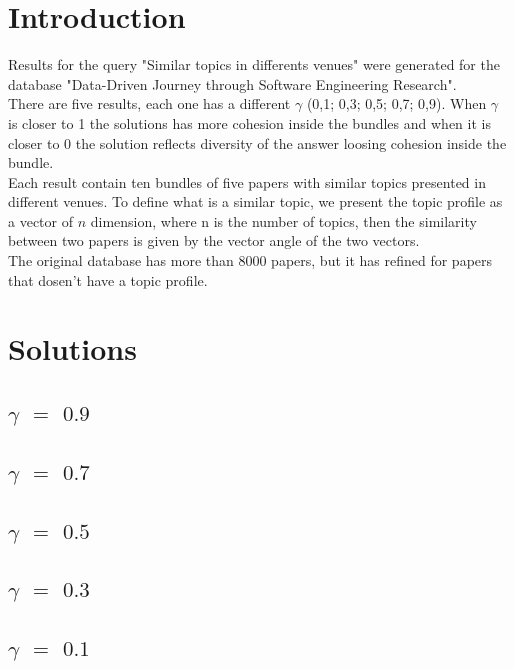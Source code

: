 \section{Introduction}
Results for the query "Similar topics in differents venues" were generated for the database 
"Data-Driven Journey through Software Engineering Research".\\
There are five results, each one has a different $\gamma$ (0,1; 0,3; 0,5; 0,7; 0,9). When $\gamma$ 
is closer to 1 the solutions has more cohesion inside the bundles and when it is closer to 0 the 
solution reflects diversity of the answer loosing cohesion inside the bundle.\\
Each result contain ten bundles of five papers with similar topics presented in different venues.
To define what is a similar topic, we present the topic profile as a vector of $n$ dimension, where 
n is the number of topics, then the similarity between two papers is given by the vector angle of 
the two vectors.\\
The original database has more than 8000 papers, but it has refined for papers that dosen't have a 
topic profile.

\cleardoublepage
\section{Solutions}
\subsection{$\gamma$ $=$ $0.9$}


\cleardoublepage
\subsection{$\gamma$ $=$ $0.7$}


\cleardoublepage
\subsection{$\gamma$ $=$ $0.5$}


\cleardoublepage
\subsection{$\gamma$ $=$ $0.3$}


\cleardoublepage
\subsection{$\gamma$ $=$ $0.1$}
%

